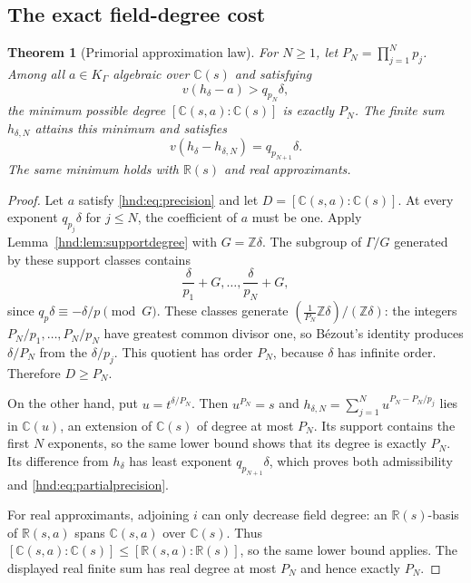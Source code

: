 \documentclass[11pt,oneside]{article}
\newtheorem{theorem}{Theorem}[section]
\theoremstyle{definition}
\theoremstyle{remark}
\newcommand{\R}{\mathbb R}
\newcommand{\C}{\mathbb C}
\newcommand{\Z}{\mathbb Z}
\begin{document}
\subsection{The exact field-degree cost}

\begin{theorem}[Primorial approximation law]\label{hnd:thm:degree}
For $N\ge1$, let $P_N=\prod_{j=1}^N p_j$. Among all $a\in K_\Gamma$
algebraic over $\C(s)$ and satisfying
\begin{equation}\label{hnd:eq:precision}
 v(h_\delta-a)>q_{p_N}\delta,
\end{equation}
the minimum possible degree $[\C(s,a):\C(s)]$ is exactly $P_N$.
The finite sum $h_{\delta,N}$ attains this minimum and satisfies
\begin{equation}\label{hnd:eq:partialprecision}
 v(h_\delta-h_{\delta,N})=q_{p_{N+1}}\delta.
\end{equation}
The same minimum holds with $\R(s)$ and real approximants.
\end{theorem}
\begin{proof}
Let $a$ satisfy \eqref{hnd:eq:precision} and let
$D=[\C(s,a):\C(s)]$. At every exponent $q_{p_j}\delta$ for $j\le N$,
the coefficient of $a$ must be one. Apply
Lemma~\ref{hnd:lem:supportdegree} with $G=\Z\delta$.
The subgroup of $\Gamma/G$ generated by these support classes contains
\[
 \frac{\delta}{p_1}+G,\ldots,\frac{\delta}{p_N}+G,
\]
since $q_p\delta\equiv-\delta/p\pmod G$.
These classes generate $(\frac1{P_N}\Z\delta)/(\Z\delta)$: the integers
$P_N/p_1,\ldots,P_N/p_N$ have greatest common divisor one, so B\'ezout's
identity produces $\delta/P_N$ from the $\delta/p_j$. This quotient has
order $P_N$, because $\delta$ has infinite order. Therefore $D\ge P_N$.

On the other hand, put $u=t^{\delta/P_N}$. Then $u^{P_N}=s$ and
$h_{\delta,N}=\sum_{j=1}^N u^{P_N-P_N/p_j}$ lies in $\C(u)$, an
extension of $\C(s)$ of degree at most $P_N$. Its support contains the first $N$
exponents, so the same lower bound shows that its degree is exactly
$P_N$. Its difference from $h_\delta$ has least exponent
$q_{p_{N+1}}\delta$, which proves both admissibility and
\eqref{hnd:eq:partialprecision}.

For real approximants, adjoining $i$ can only decrease field degree:
an $\R(s)$-basis of $\R(s,a)$ spans $\C(s,a)$ over $\C(s)$.
Thus $[\C(s,a):\C(s)]\le[\R(s,a):\R(s)]$, so the same lower bound applies. The displayed real finite sum has
real degree at most $P_N$ and hence exactly $P_N$.
\end{proof}
\end{document}
